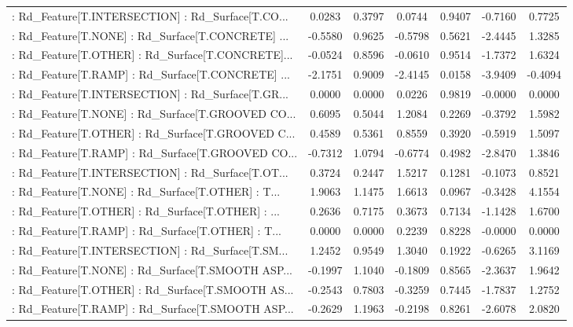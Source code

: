 \begin{longtable}{p{4cm}cccccc}
 : Rd\_Feature[T.INTERSECTION] : Rd\_Surface[T.CO... &  0.0283 &    0.3797 &  0.0744 &       0.9407 & -0.7160 &  0.7725 \\
 : Rd\_Feature[T.NONE] : Rd\_Surface[T.CONCRETE] ... & -0.5580 &    0.9625 & -0.5798 &       0.5621 & -2.4445 &  1.3285 \\
 : Rd\_Feature[T.OTHER] : Rd\_Surface[T.CONCRETE]... & -0.0524 &    0.8596 & -0.0610 &       0.9514 & -1.7372 &  1.6324 \\
 : Rd\_Feature[T.RAMP] : Rd\_Surface[T.CONCRETE] ... & -2.1751 &    0.9009 & -2.4145 &       0.0158 & -3.9409 & -0.4094 \\
 : Rd\_Feature[T.INTERSECTION] : Rd\_Surface[T.GR... &  0.0000 &    0.0000 &  0.0226 &       0.9819 & -0.0000 &  0.0000 \\
 : Rd\_Feature[T.NONE] : Rd\_Surface[T.GROOVED CO... &  0.6095 &    0.5044 &  1.2084 &       0.2269 & -0.3792 &  1.5982 \\
 : Rd\_Feature[T.OTHER] : Rd\_Surface[T.GROOVED C... &  0.4589 &    0.5361 &  0.8559 &       0.3920 & -0.5919 &  1.5097 \\
 : Rd\_Feature[T.RAMP] : Rd\_Surface[T.GROOVED CO... & -0.7312 &    1.0794 & -0.6774 &       0.4982 & -2.8470 &  1.3846 \\
 : Rd\_Feature[T.INTERSECTION] : Rd\_Surface[T.OT... &  0.3724 &    0.2447 &  1.5217 &       0.1281 & -0.1073 &  0.8521 \\
 : Rd\_Feature[T.NONE] : Rd\_Surface[T.OTHER] : T... &  1.9063 &    1.1475 &  1.6613 &       0.0967 & -0.3428 &  4.1554 \\
 : Rd\_Feature[T.OTHER] : Rd\_Surface[T.OTHER] : ... &  0.2636 &    0.7175 &  0.3673 &       0.7134 & -1.1428 &  1.6700 \\
 : Rd\_Feature[T.RAMP] : Rd\_Surface[T.OTHER] : T... &  0.0000 &    0.0000 &  0.2239 &       0.8228 & -0.0000 &  0.0000 \\
 : Rd\_Feature[T.INTERSECTION] : Rd\_Surface[T.SM... &  1.2452 &    0.9549 &  1.3040 &       0.1922 & -0.6265 &  3.1169 \\
 : Rd\_Feature[T.NONE] : Rd\_Surface[T.SMOOTH ASP... & -0.1997 &    1.1040 & -0.1809 &       0.8565 & -2.3637 &  1.9642 \\
 : Rd\_Feature[T.OTHER] : Rd\_Surface[T.SMOOTH AS... & -0.2543 &    0.7803 & -0.3259 &       0.7445 & -1.7837 &  1.2752 \\
 : Rd\_Feature[T.RAMP] : Rd\_Surface[T.SMOOTH ASP... & -0.2629 &    1.1963 & -0.2198 &       0.8261 & -2.6078 &  2.0820 \\

\end{longtable}
